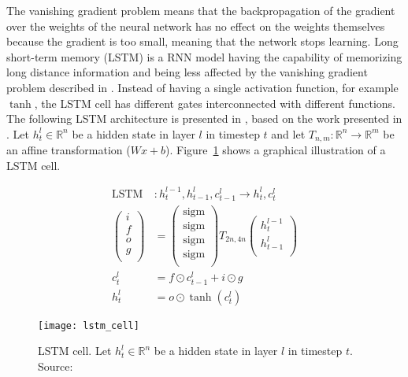 The vanishing gradient problem means that the backpropagation of the gradient over the weights of the neural network has no effect on the weights themselves because the gradient is too small, meaning that the network stops learning.
Long short-term memory (LSTM) \citep{hochreiter1997lstm} is a RNN model having the capability of memorizing long distance information and being less affected by the vanishing gradient problem described in \citet{bengio1994learning}. Instead of having a single activation function, for example $\tanh$, the LSTM cell has different gates interconnected with different functions.
The following LSTM architecture is presented in \citet{1409.2329}, based on the work presented in \citet{1303.5778}. Let $h^l_t \in \mathbb{R}^n$ be a hidden state in layer $l$ in timestep $t$ and let $T_{n,m} : \mathbb{R}^n \rightarrow \mathbb{R}^m$ be an affine transformation ($Wx + b$). Figure~\ref{fig:lstm-cell} shows a graphical illustration of a LSTM cell.

\begin{align}
    \mathrm{LSTM} &: h_t^{l-1}, h_{t-1}^l, c_{t-1}^l \rightarrow h_t^l, c_t^l\\
    \begin{pmatrix}
        i\\
        f\\
        o\\
        g\\
    \end{pmatrix} &=
    \begin{pmatrix}
        \mathrm{sigm}\\
        \mathrm{sigm}\\
        \mathrm{sigm}\\
        \mathrm{sigm}\\
    \end{pmatrix}
    T_{2n,4n}
    \begin{pmatrix}
        h_t^{l-1}\\
        h_{t-1}^l\\
    \end{pmatrix}\\
    c_t^l &= f \odot c_{t-1}^l + i \odot g\\
    h_t^l &= o \odot \tanh (c_t^l)
\end{align}

\begin{figure}
    \centering
    \texttt{[image: lstm\_cell]}
    \decoRule
    \caption[LSTM cell]{LSTM cell. Let $h^l_t \in \mathbb{R}^n$ be a hidden state in layer $l$ in timestep $t$. Source:~\citet{1409.2329}}
    \label{fig:lstm-cell}
\end{figure}

